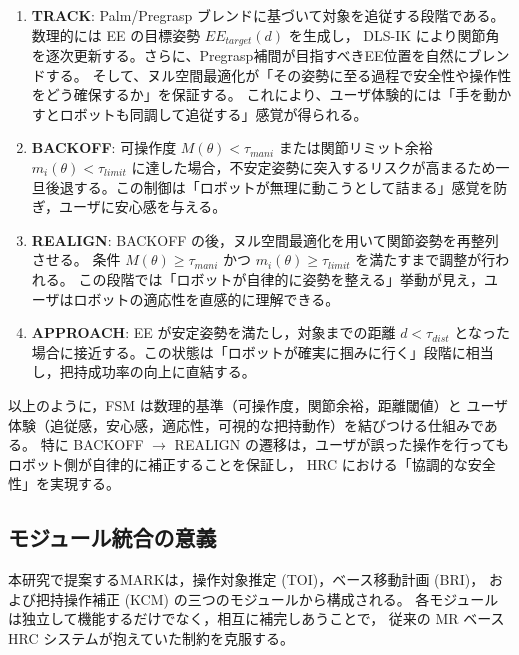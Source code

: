 \documentclass[../../main.tex]{subfiles} %
\begin{document}
\begin{enumerate}
  \item \textbf{TRACK}:
  Palm/Pregrasp ブレンドに基づいて対象を追従する段階である。
  数理的には EE の目標姿勢 $EE_{target}(d)$ を生成し，
  DLS-IK により関節角を逐次更新する。さらに、Pregrasp補間が目指すべきEE位置を自然にブレンドする。
  そして、ヌル空間最適化が「その姿勢に至る過程で安全性や操作性をどう確保するか」を保証する。
  これにより、ユーザ体験的には「手を動かすとロボットも同調して追従する」感覚が得られる。

 \item \textbf{BACKOFF}:
   可操作度 $M(\theta) < \tau_{mani}$ または関節リミット余裕 $m_i(\theta) < \tau_{limit}$ に達した場合，不安定姿勢に突入するリスクが高まるため一旦後退する。この制御は「ロボットが無理に動こうとして詰まる」感覚を防ぎ，ユーザに安心感を与える。

 \item \textbf{REALIGN}:
   BACKOFF の後，ヌル空間最適化を用いて関節姿勢を再整列させる。
   条件 $M(\theta) \geq \tau_{mani}$ かつ $m_i(\theta) \geq \tau_{limit}$ を満たすまで調整が行われる。
  この段階では「ロボットが自律的に姿勢を整える」挙動が見え，ユーザはロボットの適応性を直感的に理解できる。

 \item \textbf{APPROACH}:
  EE が安定姿勢を満たし，対象までの距離 $d < \tau_{dist}$ となった場合に接近する。この状態は「ロボットが確実に掴みに行く」段階に相当し，把持成功率の向上に直結する。
\end{enumerate}

以上のように，FSM は数理的基準（可操作度，関節余裕，距離閾値）と
ユーザ体験（追従感，安心感，適応性，可視的な把持動作）を結びつける仕組みである。
特に BACKOFF $\to$ REALIGN の遷移は，ユーザが誤った操作を行っても
ロボット側が自律的に補正することを保証し，
HRC における「協調的な安全性」を実現する。



\subsection{モジュール統合の意義}

本研究で提案するMARKは，操作対象推定 (TOI)，ベース移動計画 (BRI)，
および把持操作補正 (KCM) の三つのモジュールから構成される。
各モジュールは独立して機能するだけでなく，相互に補完しあうことで，
従来の MR ベース HRC システムが抱えていた制約を克服する。
\end{document}
